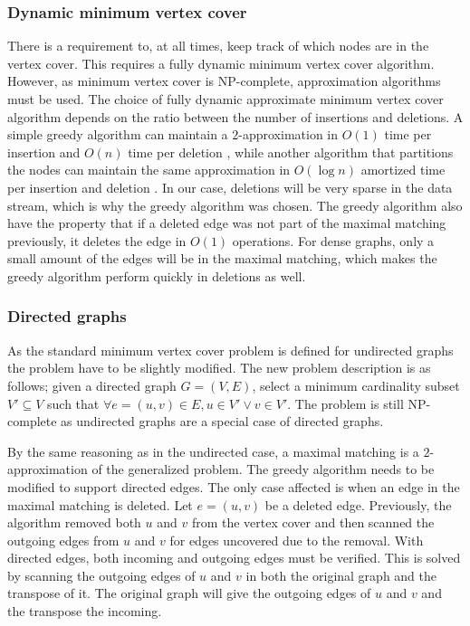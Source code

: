 \subsubsection{Dynamic minimum vertex cover}
There is a requirement to, at all times, keep track of which nodes are in the vertex cover. This requires a fully dynamic minimum vertex cover algorithm. However, as minimum vertex cover is NP-complete, approximation algorithms must be used. The choice of fully dynamic approximate minimum vertex cover algorithm depends on the ratio between the number of insertions and deletions. A simple greedy algorithm can maintain a $2$-approximation in $O(1)$ time per insertion and $O(n)$ time per deletion \cite{2appdynvc}, while another algorithm that partitions the nodes can maintain the same approximation in $O(\log n )$ amortized time per insertion and deletion \cite{2appdynvclogn}. In our case, deletions will be very sparse in the data stream, which is why the greedy algorithm was chosen. The greedy algorithm also have the property that if a deleted edge was not part of the maximal matching previously, it deletes the edge in $O(1)$ operations. For dense graphs, only a small amount of the edges will be in the maximal matching, which makes the greedy algorithm perform quickly in deletions as well. 

 
\subsubsection{Directed graphs}
As the standard minimum vertex cover problem is defined for undirected graphs the problem have to be slightly modified. The new problem description is as follows; given a directed graph $G = (V,E)$, select a minimum cardinality subset $V' \subseteq V$ such that $\forall e = (u,v) \in E, u \in V' \vee v \in V'$. The problem is still NP-complete as undirected graphs are a special case of directed graphs. 

By the same reasoning as in the undirected case, a maximal matching is a $2$-approximation of the generalized problem. The greedy algorithm needs to be modified to support directed edges. The only case affected is when an edge in the maximal matching is deleted. Let $e = (u,v)$ be a deleted edge. Previously, the algorithm removed both $u$ and $v$ from the vertex cover and then scanned the outgoing edges from $u$ and $v$ for edges uncovered due to the removal. With directed edges, both incoming and outgoing edges must be verified. This is solved by scanning the outgoing edges of $u$ and $v$ in both the original graph and the transpose of it. The original graph will give the outgoing edges of $u$ and $v$ and the transpose the incoming.

